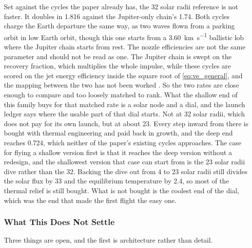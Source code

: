 \documentclass{article}
\begin{document}
Set against the cycles the paper already has, the 32 solar radii reference is not faster. It doubles in \SI{1.816}{\year} against the Jupiter-only chain's \SI{1.74}{\year}. Both cycles charge the Earth departure the same way, as two waves flown from a parking orbit in low Earth orbit, though this one starts from a \SI{3.60}{\kilo\meter\per\second} ballistic lob where the Jupiter chain starts from rest. The nozzle efficiencies are not the same parameter and should not be read as one. The Jupiter chain is swept on the recovery fraction, which multiplies the whole impulse, while these cycles are scored on the jet energy efficiency inside the square root of \autoref{eq:ve_general}, and the mapping between the two has not been worked \cite{Katz_aim_is_all_you_need_2025}. So the two rates are close enough to compare and too loosely matched to rank. What the shallow end of this family buys for that matched rate is a solar node and a dial, and the launch ledger says where the usable part of that dial starts. Not at 32 solar radii, which does not pay for its own launch, but at about 23. Every step inward from there is bought with thermal engineering and paid back in growth, and the deep end reaches \SI{0.724}{\year}, which neither of the paper's existing cycles approaches. The case for flying a shallow version first is that it reaches the deep version without a redesign, and the shallowest version that case can start from is the 23 solar radii dive rather than the 32. Backing the dive out from 4 to 23 solar radii still divides the solar flux by 33 and the equilibrium temperature by 2.4, so most of the thermal relief is still bought. What is not bought is the coolest end of the dial, which was the end that made the first flight the easy one.

\subsubsection{What This Does Not Settle}\label{sec:jovian_dive_open}
Three things are open, and the first is architecture rather than detail.
\end{document}

